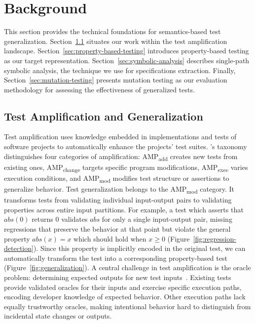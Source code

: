 \section{Background}
\label{sec:background}

This section provides the technical foundations for semantics-based test generalization.
Section~\ref{sec:test-amplification} situates our work
within the test amplification landscape.
Section~\ref{sec:property-based-testing}
introduces property-based testing as our target representation.
Section~\ref{sec:symbolic-analysis} describes single-path symbolic analysis,
the technique we use for specifications extraction.
Finally, Section~\ref{sec:mutation-testing}
presents mutation testing as our evaluation methodology
for assessing the effectiveness of generalized tests.

\subsection{Test Amplification and Generalization}
\label{sec:test-amplification}

Test amplification uses knowledge embedded in implementations and tests of software projects
to automatically enhance the projects' test suites.
\citeauthor{danglot_2019_snowballing}'s taxonomy~\cite{danglot_2019_snowballing}
distinguishes four categories of amplification:
AMP\textsubscript{add} creates new tests from existing ones,
AMP\textsubscript{change} targets specific program modifications,
AMP\textsubscript{exec} varies execution conditions,
and AMP\textsubscript{mod} modifies test structure or assertions to generalize behavior.
%
Test generalization belongs to the AMP\textsubscript{mod} category. 
It transforms tests from validating individual input-output pairs
to validating properties across entire input partitions.
For example, a test which asserts that $abs(0)$ returns $0$
validates $abs$ for only a single input-output pair,
missing regressions that preserve the behavior at that point
but violate the general property $abs(x) = x$
which should hold when $x \geq 0$
(Figure~\ref{fig:regression-detection}).
Since this property is implicitly encoded in the original test,
we can automatically transform the test
into a corresponding property-based test (Figure~\ref{fig:generalization}).
%
A central challenge in test amplification is the oracle problem:
determining expected outputs for new test inputs~\cite{barr_2015_oracle}.
Existing tests provide validated oracles for their inputs and exercise specific execution paths,
encoding developer knowledge of expected behavior.
Other execution paths lack equally trustworthy oracles,
making intentional behavior hard to distinguish
from incidental state changes or outputs.

